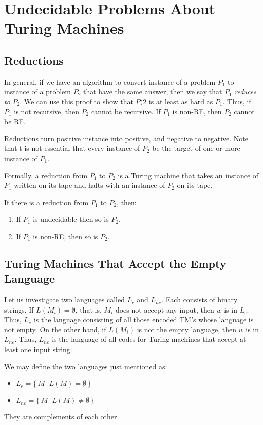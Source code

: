 \documentclass[]{article}
\begin{document}
\section*{Undecidable Problems About Turing Machines}
\subsection*{Reductions}
In general, if we have an algorithm to convert instance of a problem $P_1$ to
instance of a problem $P_2$ that have the same answer, then we say that $P_1$
\emph{reduces to} $P_2$. We can use this proof to show that $P)2$ is at least as
hard as $P_1$. Thus, if $P_1$ is not recursive, then $P_2$ cannot be recursive.
If $P_1$ is non-RE, then $P_2$ cannot be RE.

Reductions turn positive instance into positive, and negative to negative. Note
that t is not essential that every instance of $P_2$ be the target of one or
more instance of $P_1$.

Formally, a reduction from $P_1$ to $P_2$ is a Turing machine that takes an
instance of $P_1$ written on its tape and halts with an instance of $P_2$ on its
tape.

\begin{thm}
If there is a reduction from $P_1$ to $P_2$, then:
\begin{enumerate}
\item If $P_1$ is undecidable then so is $P_2$.
\item If $P_1$ is non-RE, then so is $P_2$.
\end{enumerate}
\end{thm}

\subsection*{Turing Machines That Accept the Empty Language}
Let us investigate two languages called $L_e$ and $L_{ne}$. Each consists of
binary strings. If $L(M_i) = \emptyset$, that is, $M_i$ does not accept any
input, then $w$ is in $L_e$. Thus, $L_e$ is the language consisting of all those
encoded TM's whose language is not empty. On the other hand, if $L(M_i)$ is not
the empty language, then $w$ is in $L_{ne}$. Thus, $L_{ne}$ is the language of
all codes for Turing machines that accept at least one input string.

We may define the two languages just mentioned as:
\begin{itemize}
\item $L_e = \{\,M\,|\,L(M)=\emptyset\,\}$
\item $L_{ne} = \{\,M\,|\,L(M)\neq\emptyset\,\}$
\end{itemize}
They are complements of each other.
\end{document}
